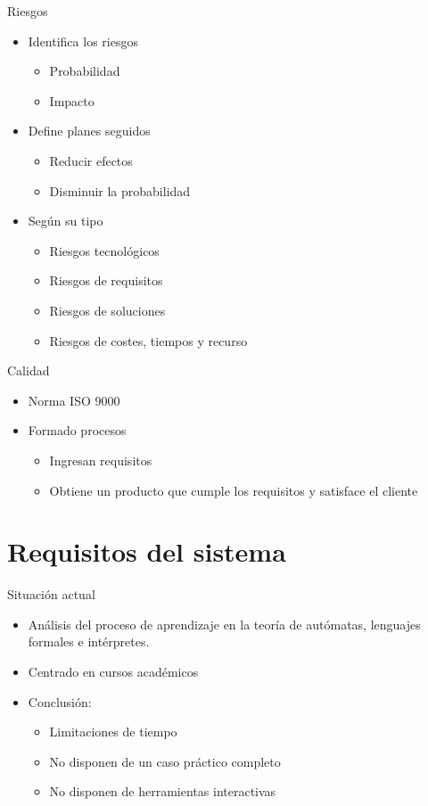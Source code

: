 \documentclass[spanish]{beamer}
\begin{document}
\begin{frame}{Riesgos}
    \begin{itemize}
      \item Identifica los riesgos  
      \begin{itemize}
         \item Probabilidad
         \item Impacto
      \end{itemize}
      \item Define planes seguidos
      \begin{itemize}
         \item Reducir efectos
         \item Disminuir la probabilidad 
      \end{itemize}
      \item Según su tipo
      \begin{itemize}
         \item Riesgos tecnológicos
         \item Riesgos de requisitos
         \item Riesgos de soluciones
         \item Riesgos de costes, tiempos y recurso
      \end{itemize}
   \end{itemize}
\end{frame}

\begin{frame}{Calidad}
    \begin{itemize}
      \item Norma ISO 9000
      \item Formado procesos
      \begin{itemize}
         \item Ingresan requisitos
         \item Obtiene un producto que cumple los requisitos y satisface el cliente
      \end{itemize}
   \end{itemize}
\end{frame}

\section{Requisitos del sistema}
\begin{frame}{Situación actual}
    \begin{itemize}
      \item Análisis del proceso de aprendizaje en la teoría de autómatas, lenguajes formales e intérpretes. 
      \item Centrado en cursos académicos
      \item Conclusión:
      \begin{itemize}
         \item Limitaciones de tiempo
         \item No disponen de un caso práctico completo
         \item No disponen de herramientas interactivas
      \end{itemize}
   \end{itemize}
\end{frame}
\end{document}
